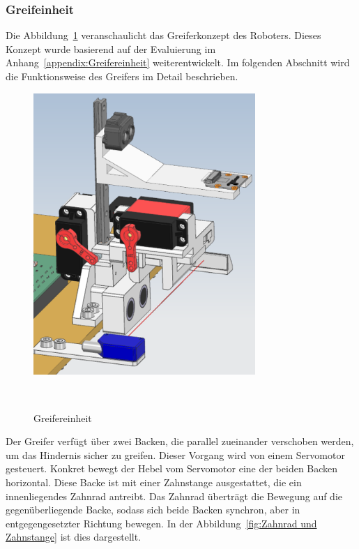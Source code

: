 \documentclass[main.tex]{subfiles} %
\begin{document}

\subsubsection{Greifeinheit}


Die Abbildung~\ref{fig:Greifereinheit} veranschaulicht das Greiferkonzept des Roboters. Dieses Konzept wurde basierend auf der Evaluierung 
im Anhang~\ref{appendix:Greifereinheit} weiterentwickelt. Im folgenden Abschnitt wird die Funktionsweise des Greifers im Detail beschrieben.

\begin{figure}[H]
    \centering
    \includegraphics[width=0.75\textwidth]{Greifereinheit_Uebersicht.png}
    \caption{Greifereinheit}~\label{fig:Greifereinheit}
\end{figure}

Der Greifer verfügt über zwei Backen, die parallel zueinander verschoben werden, um das Hindernis sicher zu greifen. 
Dieser Vorgang wird von einem Servomotor gesteuert. Konkret bewegt der Hebel vom Servomotor eine der beiden Backen horizontal. 
Diese Backe ist mit einer Zahnstange ausgestattet, die ein innenliegendes Zahnrad antreibt. Das Zahnrad überträgt die 
Bewegung auf die gegenüberliegende Backe, sodass sich beide Backen synchron, aber in entgegengesetzter Richtung bewegen.
In der Abbildung~\ref{fig:Zahnrad und Zahnstange} ist dies dargestellt.
\end{document}
